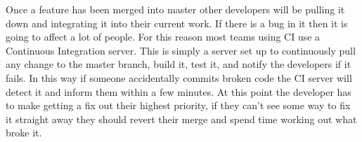   Once a feature has been merged into master other developers will be pulling it
  down and integrating it into their current work.  If there is a bug in it then
  it is going to affect a lot of people.  For this reason most teams using CI
  use a Continuous Integration server.  This is simply a server set up to
  continuously pull any change to the master branch, build it, test it, and
  notify the developers if it fails.  In this way if someone accidentally
  commits broken code the CI server will detect it and inform them within a few
  minutes.  At this point the developer has to make getting a fix out their
  highest priority, if they can't see some way to fix it straight away they
  should revert their merge and spend time working out what broke it.

